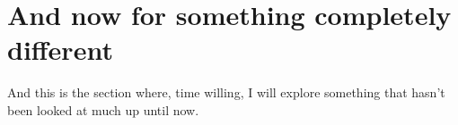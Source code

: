 \documentclass[11pt]{amsart}
\theoremstyle{plain}
\theoremstyle{definition}
\begin{document}
\section{And now for something completely different}
And this is the section where, time willing, I will explore something that hasn't been looked at much up until now.

\nocite{*}


\end{document}
